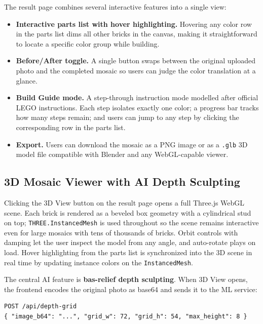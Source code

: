 \documentclass[12pt]{article}
\begin{document}
The result page combines several interactive features into a single view:

\begin{itemize}[leftmargin=*]
    \item \textbf{Interactive parts list with hover highlighting.} Hovering any
          color row in the parts list dims all other bricks in the canvas,
          making it straightforward to locate a specific color group while
          building.

    \item \textbf{Before/After toggle.} A single button swaps between the
          original uploaded photo and the completed mosaic so users can judge
          the color translation at a glance.

    \item \textbf{Build Guide mode.} A step-through instruction mode modelled
          after official LEGO instructions. Each step isolates exactly one
          color; a progress bar tracks how many steps remain; and users can
          jump to any step by clicking the corresponding row in the parts list.

    \item \textbf{Export.} Users can download the mosaic as a PNG image or as
          a \texttt{.glb} 3D model file compatible with Blender and any
          WebGL-capable viewer.
\end{itemize}

\subsection{3D Mosaic Viewer with AI Depth Sculpting}

Clicking the 3D View button on the result page opens a full Three.js WebGL
scene. Each brick is rendered as a beveled box geometry with a cylindrical
stud on top; \texttt{THREE.InstancedMesh} is used throughout so the scene
remains interactive even for large mosaics with tens of thousands of bricks.
Orbit controls with damping let the user inspect the model from any angle, and
auto-rotate plays on load. Hover highlighting from the parts list is
synchronized into the 3D scene in real time by updating instance colors on the
\texttt{InstancedMesh}.

The central AI feature is \textbf{bas-relief depth sculpting}. When 3D View
opens, the frontend encodes the original photo as base64 and sends it to the
ML service:

\begin{verbatim}
POST /api/depth-grid
{ "image_b64": "...", "grid_w": 72, "grid_h": 54, "max_height": 8 }
\end{verbatim}
\end{document}
